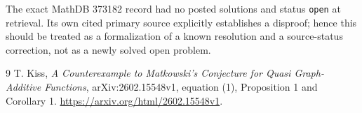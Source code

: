 \documentclass[11pt]{article}
\begin{document}
The exact MathDB 373182 record had no posted solutions and status
\texttt{open} at retrieval. Its own cited primary source \cite{Kiss}
explicitly establishes a disproof; hence this should be treated as a
formalization of a known resolution and a source-status correction,
not as a newly solved open problem.
\begin{thebibliography}{9}
 T. Kiss, \emph{A Counterexample to Matkowski's Conjecture for
Quasi Graph-Additive Functions}, arXiv:2602.15548v1, equation (1),
Proposition 1 and Corollary 1.
\url{https://arxiv.org/html/2602.15548v1}.
\end{thebibliography}
\end{document}

